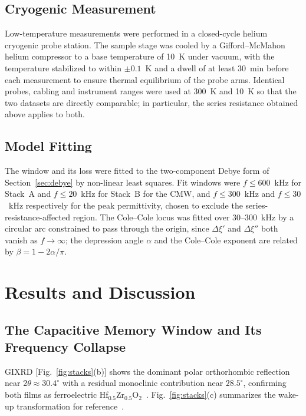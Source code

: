 \documentclass[journal]{IEEEtran}
\newcommand{\hzo}{Hf$_{0.5}$Zr$_{0.5}$O$_{2}$}
\begin{document}
\subsection{Cryogenic Measurement}
Low-temperature measurements were performed in a closed-cycle helium
cryogenic probe station. The sample stage was cooled by a Gifford--McMahon
helium compressor to a base temperature of 10~K under vacuum, with the
temperature stabilized to within $\pm0.1$~K and a dwell of at least 30~min
before each measurement to ensure thermal equilibrium of the probe arms.
Identical probes, cabling and instrument ranges were used at 300~K and 10~K
so that the two datasets are directly comparable; in particular, the series
resistance obtained above applies to both.

\subsection{Model Fitting}
The window and its loss were fitted to the two-component Debye form of
Section~\ref{sec:debye} by non-linear least squares. Fit windows were
$f \le 600$~kHz for Stack~A and $f \le 20$~kHz for Stack~B for the CMW, and
$f \le 300$~kHz and $f \le 30$~kHz respectively for the peak permittivity,
chosen to exclude the series-resistance-affected region. The Cole--Cole locus
was fitted over 30--300~kHz by a circular arc constrained to pass through the
origin, since $\Delta\xi'$ and $\Delta\xi''$ both vanish as
$f \rightarrow \infty$; the depression angle $\alpha$ and the Cole--Cole
exponent are related by $\beta = 1 - 2\alpha/\pi$.

\section{Results and Discussion}

\subsection{The Capacitive Memory Window and Its Frequency Collapse}
GIXRD [Fig.~\ref{fig:stacks}(b)] shows the dominant polar orthorhombic
reflection near $2\theta \approx 30.4^\circ$ with a residual monoclinic
contribution near $28.5^\circ$, confirming both films as ferroelectric
\hzo{}~\cite{boscke2011,muller2012,iung2025}. Fig.~\ref{fig:stacks}(c)
summarizes the wake-up transformation for
reference~\cite{pesic2016,schenk2014,grimley2016,cho2024wakeup}.
\end{document}
